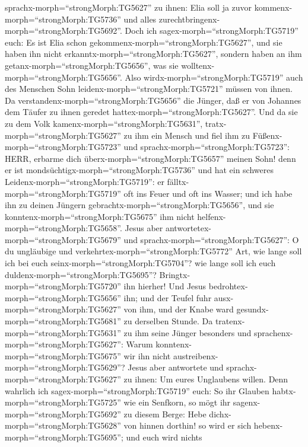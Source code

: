 sprachx-morph=``strongMorph:TG5627'' zu ihnen: Elia soll ja zuvor
kommenx-morph=``strongMorph:TG5736'' und alles
zurechtbringenx-morph=``strongMorph:TG5692''.  Doch ich
sagex-morph=``strongMorph:TG5719'' euch: Es ist Elia schon
gekommenx-morph=``strongMorph:TG5627'', und sie haben ihn nicht
erkanntx-morph=``strongMorph:TG5627'', sondern haben an ihm
getanx-morph=``strongMorph:TG5656'', was sie
wolltenx-morph=``strongMorph:TG5656''. Also
wirdx-morph=``strongMorph:TG5719'' auch des Menschen Sohn
leidenx-morph=``strongMorph:TG5721'' müssen von ihnen.  Da
verstandenx-morph=``strongMorph:TG5656'' die Jünger, daß er von Johannes
dem Täufer zu ihnen geredet hattex-morph=``strongMorph:TG5627''.
 Und da sie zu dem Volk
kamenx-morph=``strongMorph:TG5631'', tratx-morph=``strongMorph:TG5627''
zu ihm ein Mensch und fiel ihm zu Füßenx-morph=``strongMorph:TG5723''
 und sprachx-morph=``strongMorph:TG5723'': HERR, erbarme
dich überx-morph=``strongMorph:TG5657'' meinen Sohn! denn er ist
mondsüchtigx-morph=``strongMorph:TG5736'' und hat ein schweres
Leidenx-morph=``strongMorph:TG5719'': er
fälltx-morph=``strongMorph:TG5719'' oft ins Feuer und oft ins Wasser;
 und ich habe ihn zu deinen Jüngern
gebrachtx-morph=``strongMorph:TG5656'', und sie
konntenx-morph=``strongMorph:TG5675'' ihm nicht
helfenx-morph=``strongMorph:TG5658''.  Jesus aber
antwortetex-morph=``strongMorph:TG5679'' und
sprachx-morph=``strongMorph:TG5627'': O du ungläubige und
verkehrtex-morph=``strongMorph:TG5772'' Art, wie lange soll ich bei euch
seinx-morph=``strongMorph:TG5704''? wie lange soll ich euch
duldenx-morph=``strongMorph:TG5695''?
Bringtx-morph=``strongMorph:TG5720'' ihn hierher!  Und
Jesus bedrohtex-morph=``strongMorph:TG5656'' ihn; und der Teufel fuhr
ausx-morph=``strongMorph:TG5627'' von ihm, und der Knabe ward
gesundx-morph=``strongMorph:TG5681'' zu derselben Stunde. 
Da tratenx-morph=``strongMorph:TG5631'' zu ihm seine Jünger besonders
und sprachenx-morph=``strongMorph:TG5627'': Warum
konntenx-morph=``strongMorph:TG5675'' wir ihn nicht
austreibenx-morph=``strongMorph:TG5629''?  Jesus aber
antwortete und sprachx-morph=``strongMorph:TG5627'' zu ihnen: Um eures
Unglaubens willen. Denn wahrlich ich sagex-morph=``strongMorph:TG5719''
euch: So ihr Glauben habtx-morph=``strongMorph:TG5725'' wie ein
Senfkorn, so mögt ihr sagenx-morph=``strongMorph:TG5692'' zu diesem
Berge: Hebe dichx-morph=``strongMorph:TG5628'' von hinnen dorthin! so
wird er sich hebenx-morph=``strongMorph:TG5695''; und euch wird nichts
